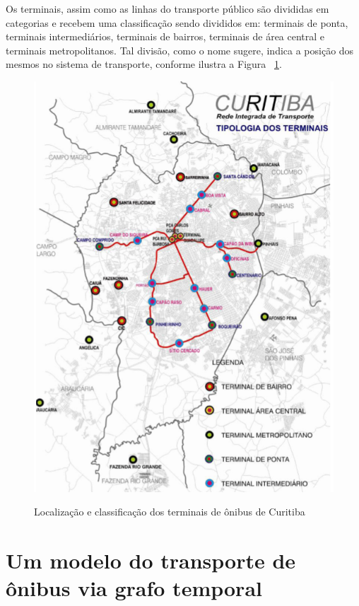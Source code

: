 Os terminais, assim como as linhas do transporte público são divididas em categorias e  recebem uma classificação sendo divididos em: terminais de ponta, terminais intermediários, terminais de bairros, terminais de área central e terminais metropolitanos. Tal divisão, como o nome sugere, indica a posição dos mesmos no sistema de transporte, conforme ilustra a Figura ~\ref{fig:terminais}.
 \begin{figure}[!h]
 \caption{Localização e classificação dos terminais de ônibus de Curitiba}
     \centering
     \includegraphics[scale=.95]{./Capitulo3/img/terminais.png}
         \label{fig:terminais}
 \end{figure}

\section{Um modelo do transporte de ônibus via grafo temporal} \label{sec:met}


